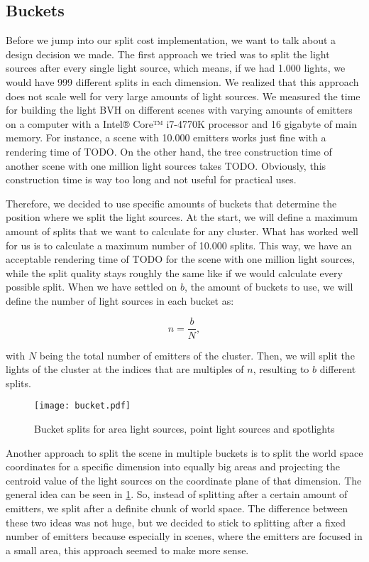\subsection{Buckets}
\label{subs:buckets}

Before we jump into our split cost implementation, we want to talk about a design decision we made. The first approach we tried was to split the light sources after every single light source, which means, if we had 1.000 lights, we would have 999 different splits in each dimension. We realized that this approach does not scale well for very large amounts of light sources. We measured the time for building the light BVH on different scenes with varying amounts of emitters on a computer with a Intel® Core™ i7-4770K processor and 16 gigabyte of main memory. For instance, a scene with 10.000 emitters works just fine with a rendering time of TODO. On the other hand, the tree construction time of another scene with one million light sources takes TODO. Obviously, this construction time is way too long and not useful for practical uses. 

Therefore, we decided to use specific amounts of buckets that determine the position where we split the light sources. At the start, we will define a maximum amount of splits that we want to calculate for any cluster. What has worked well for us is to calculate a maximum number of 10.000 splits. This way, we have an acceptable rendering time of TODO for the scene with one million light sources, while the split quality stays roughly the same like if we would calculate every possible split. When we have settled on $b$, the amount of buckets to use, we will define the number of light sources in each bucket as:

\begin{equation}
n = \frac{b}{N},
\end{equation}

with $N$ being the total number of emitters of the cluster. Then, we will split the lights of the cluster at the indices that are multiples of $n$, resulting to $b$ different splits. 

\begin{figure}
	\begin{center}
		\texttt{[image: bucket.pdf]}
		\caption{Bucket splits for area light sources, point light sources and spotlights}
		\label{fig:bucket}
	\end{center}
\end{figure}

Another approach to split the scene in multiple buckets is to split the world space coordinates for a specific dimension into equally big areas and projecting the centroid value of the light sources on the coordinate plane of that dimension. The general idea can be seen in \ref{fig:bucket}. So, instead of splitting after a certain amount of emitters, we split after a definite chunk of world space. The difference between these two ideas was not huge, but we decided to stick to splitting after a fixed number of emitters because especially in scenes, where the emitters are focused in a small area, this approach seemed to make more sense.

